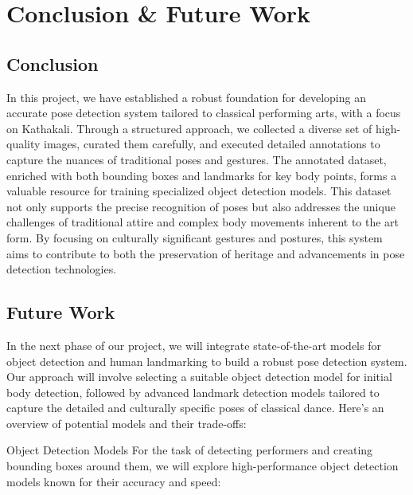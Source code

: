 \chapter{Conclusion \& Future Work}

\section{Conclusion}

In this project, we have established a robust foundation for developing an accurate pose detection system tailored to classical performing arts, with a focus on Kathakali. Through a structured approach, we collected a diverse set of high-quality images, curated them carefully, and executed detailed annotations to capture the nuances of traditional poses and gestures. The annotated dataset, enriched with both bounding boxes and landmarks for key body points, forms a valuable resource for training specialized object detection models. This dataset not only supports the precise recognition of poses but also addresses the unique challenges of traditional attire and complex body movements inherent to the art form. By focusing on culturally significant gestures and postures, this system aims to contribute to both the preservation of heritage and advancements in pose detection technologies.
\section{Future Work}

In the next phase of our project, we will integrate state-of-the-art models for object detection and human landmarking to build a robust pose detection system. Our approach will involve selecting a suitable object detection model for initial body detection, followed by advanced landmark detection models tailored to capture the detailed and culturally specific poses of classical dance. Here’s an overview of potential models and their trade-offs:

Object Detection Models
For the task of detecting performers and creating bounding boxes around them, we will explore high-performance object detection models known for their accuracy and speed:

